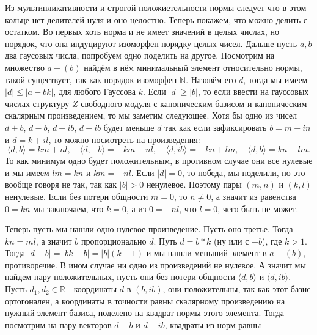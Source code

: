 \documentclass{article}
\begin{document}
\begin{enumerate}
\begin{enumerate}
                Из мультипликативности и строгой положиетельности нормы следует
                что в этом кольце нет делителей нуля и оно целостно. Теперь покажем,
                что можно делить с остатком. Во первых хоть норма и не имеет
                значений в целых числах, но порядок, что она индуцируют
                изоморфен порядку целых чисел. Дальше пусть $a,b$ два гаусовых
                числа, попробуем одно поделить на другое. Посмотрим на множество
                $a-(b)$ найдём в нём минимальный элемент относительно нормы,
                такой существует, так как порядок изоморфен $\mathbb{N}$.
                Назовём его $d$, тогда мы имеем $|d|\leq|a-bk|$, для любого
                Гауссова $k$. Если $|d|\geq|b|$, то если ввести на гауссовых 
                числах структуру $Z$ свободного модуля с каноническим базисом
                и каноническим скалярным произведением, то мы заметим следующее.
                Хотя бы одно из чисел $d+b$, $d-b$, $d+ib$, $d-ib$ будет меньше
                $d$ так как если зафиксировать $b=m+in$ и $d=k+il$, то можно
                посмотреть на произведения:
                \[\langle d,b\rangle=km+nl,\quad\langle d,-b\rangle=-km-nl,\quad
                \langle d,ib\rangle=-kn+lm,\quad\langle d,b\rangle=kn-lm.\] То как
                минимум одно будет положительным, в противном случае они все нулевые
                и мы имеем $lm=kn$ и $km=-nl$. Если $|d|=0$, то победа, мы
                поделили, но это вообще говоря не так, так как $|b|>0$ ненулевое.
                Поэтому пары $(m,n)$ и $(k,l)$ ненулевые. Если без потери
                общности $m=0$, то $n\neq 0$, а значит из равенства $0=kn$
                мы заключаем, что $k=0$, а из $0=-nl$, что $l=0$, чего быть не
                может.

                Теперь пусть мы нашли одно нулевое произведение. Пусть оно
                третье. Тогда $kn=ml$, а значит $b$ пропорционально $d$. Путь
                $d=b*k$ (ну или с $-b$), где $k>1$. Тогда $|d-b|=|bk-b|=|b|(k-1)$
                и мы нашли меньший элемент в $a-(b)$, противоречие. В ином
                случае ни одно из произведений не нулевое. А значит мы найдем
                пару положительных, пусть они без потери общности $\langle d,b\rangle$
                и $\langle d,ib\rangle$. Пусть $d_1,d_2\in\mathbb{R}$ -
                координаты $d$ в $(b,ib)$, они положительны, так как этот базис
                ортогонален, а координаты в точности равны скалярному
                произведению на нужный элемент базиса, поделено на квадрат
                нормы этого элемента. Тогда посмотрим на пару векторов $d-b$ и
                $d-ib$, квадраты из норм равны
                

\end{enumerate}
\end{enumerate}
\end{document}

